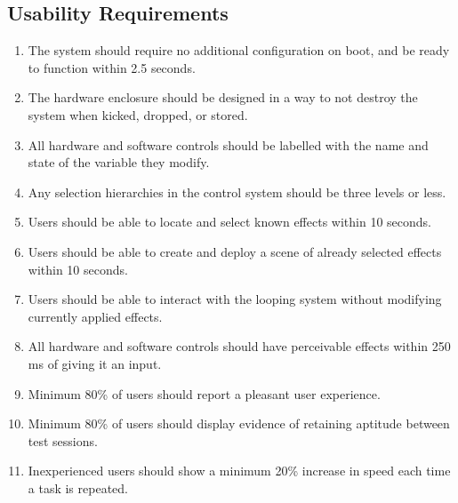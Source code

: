 \subsection{Usability Requirements}
    \begin{enumerate}[label=\alph*.]
        \item The system should require no additional configuration on boot, and be ready to function within 2.5 seconds. %
        \item The hardware enclosure should be designed in a way to not destroy the system when kicked, dropped, or stored. %
        \item All hardware and software controls should be labelled with the name and state of the variable they modify.
        \item Any selection hierarchies in the control system should be three levels or less.
        \item Users should be able to locate and select known effects within 10 seconds. %
        \item Users should be able to create and deploy a scene of already selected effects within 10 seconds.
        \item Users should be able to interact with the looping system without modifying currently applied effects.
        \item All hardware and software controls should have perceivable effects within 250 ms of giving it an input.
        \item Minimum 80\% of users should report a pleasant user experience.
        \item Minimum 80\% of users should display evidence of retaining aptitude between test sessions.
        \item Inexperienced users should show a minimum 20\% increase in speed each time a task is repeated.
        
    \end{enumerate}

